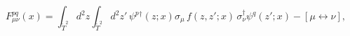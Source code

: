 \begin{equation}\label{fF}
F_{\mu\nu}^{pq}(x)
=\int_{\tilde T^2}d^2z\int_{\tilde T^2}d^2z'\,
\psi^p{}^\dagger(z;x)\sigma_\mu\,
f(z,z';x)\,\sigma_\nu^\dagger\psi^q(z';x)-[\mu\leftrightarrow\nu],
\end{equation}

